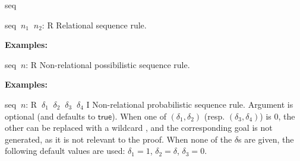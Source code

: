 \begin{tactic}{seq}
  \begin{tsyntax}{seq $\ n_1$ $\ n_2$: R}
  Relational sequence rule.

  \textbf{Examples:}
  \end{tsyntax}

  \begin{tsyntax}{seq $\ n$: R}
  Non-relational possibilistic sequence rule.

  \textbf{Examples:}
  \end{tsyntax}

  \begin{tsyntax}{seq $\ n$: R $\ \delta_1$ $\ \delta_2$ $\ \delta_3$ $\ \delta_4$ I}
  Non-relational probabilistic sequence rule. Argument  is
  optional (and defaults to $\mathsf{true}$). When one of
  $(\delta_1,\delta_2)$ (resp. $(\delta_3,\delta_4)$) is 0, the other
  can be replaced with a wildcard \ec{_}, and the corresponding goal
  is not generated, as it is not relevant to the proof. When none of
  the $\delta$s are given, the following default values are used:
  $\delta_1 = 1$, $\delta_2 = \delta$, $\delta_3 = 0$.


\end{tsyntax}
\end{tactic}
